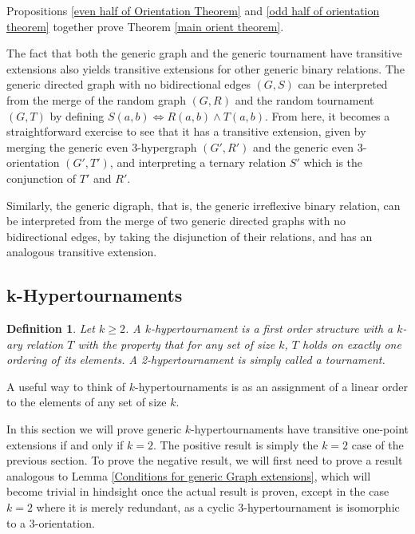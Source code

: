 \documentclass{amsart}
\newtheorem{definition}[theorem]{Definition}
\newcommand{\set}[1]{\{#1 \}}
\begin{document}
Propositions \ref{even half of Orientation Theorem} and \ref{odd half of orientation theorem} together prove Theorem \ref{main orient theorem}.

The fact that both the generic graph and the generic tournament have transitive extensions also yields transitive extensions for other generic binary relations. The generic directed graph with no bidirectional edges $(G, S)$ can be interpreted from the merge of the random graph $(G, R)$ and the random tournament $(G,T)$ by defining $S(a,b) \iff R(a,b) \wedge T(a,b)$. From here, it becomes a straightforward exercise to see that it has a transitive extension, given by merging the generic even 3-hypergraph $(G', R')$ and the generic even 3-orientation $(G', T')$, and interpreting a ternary relation $S'$ which is the conjunction of $T'$ and $R'$.

Similarly, the generic digraph, that is, the generic irreflexive binary relation, can be interpreted from the merge of two generic directed graphs with no bidirectional edges, by taking the disjunction of their relations, and has an analogous transitive extension.


\subsection{k-Hypertournaments}

\begin{definition}
    Let $k \geq 2$. A \emph{$k$-hypertournament} is a first order structure with a $k$-ary relation $T$ with the property that for any set of size $k$, $T$ holds on exactly one ordering of its elements. A 2-hypertournament is simply called a tournament.
\end{definition}

A useful way to think of $k$-hypertournaments is as an assignment of a linear order to the elements of any set of size $k$.

In this section we will prove generic $k$-hypertournaments have transitive one-point extensions if and only if $k = 2$. The positive result is simply the $k=2$ case of the previous section. To prove the negative result, we will first need to prove a result analogous to Lemma \ref{Conditions for generic Graph extensions}, which will become trivial in hindsight once the actual result is proven, except in the case $k=2$ where it is merely redundant, as a cyclic 3-hypertournament is isomorphic to a 3-orientation.

\end{document}

